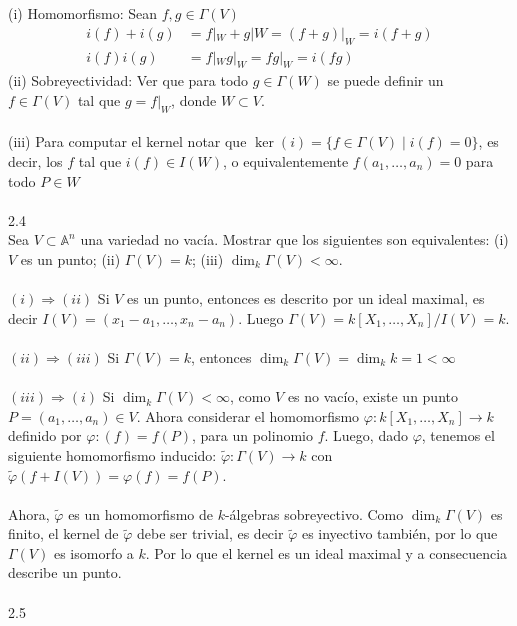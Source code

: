 \documentclass{article}
\newcommand{\A}{\mathbb{A}}
\begin{document}
\\
\\
(i) Homomorfismo: Sean $f,g \in \Gamma(V)$
\begin{equation*}
\begin{aligned}
    i(f)+i(g)&=f|_W + g|W=(f+g)|_W=i(f+g) \\
    i(f)i(g)&=f|_W g|_W=fg|_W=i(fg)
\end{aligned}
\end{equation*}
(ii) Sobreyectividad: Ver que para todo $g \in \Gamma(W)$ se puede definir un $f \in \Gamma(V)$ tal que $g=f|_W$, donde $W \subset V$.
\\
\\
(iii) Para computar el kernel notar que $\operatorname{ker}(i)=\{ f \in \Gamma(V) \mid i(f)=0\}$, es decir, los $f$ tal que $i(f) \in I(W)$, o equivalentemente $f(a_1,\dots,a_n)=0$ para todo $P \in W$
\\
\\
2.4
\\
Sea $V \subset \A^n$ una variedad no vacía. Mostrar que los siguientes son equivalentes: (i) $V$ es un punto; (ii) $\Gamma(V)=k$; (iii) $\operatorname{dim}_{k}\Gamma(V) < \infty$.
\\
\\
$(i) \Longrightarrow (ii)$ Si $V$ es un punto, entonces es descrito por un ideal maximal, es decir $I(V)=(x_1-a_1,\dots,x_n-a_n)$. Luego $\Gamma(V)=k[X_1,\dots,X_n]/I(V)=k$.
\\
\\
$(ii) \Longrightarrow (iii)$ Si $\Gamma(V)=k$, entonces $\operatorname{dim}_{k}\Gamma(V)=\operatorname{dim}_{k}k=1<\infty$
\\
\\
$(iii)\Longrightarrow(i)$ Si $\operatorname{dim}_{k}\Gamma(V) < \infty$, como $V$ es no vacío, existe un punto $P=(a_1,\dots,a_n) \in V$. Ahora considerar el homomorfismo $\varphi: k[X_1,\dots,X_n]\to k$ definido por $\varphi:(f)=f(P)$, para un polinomio $f$. Luego, dado $\varphi$, tenemos el siguiente homomorfismo inducido: $\tilde{\varphi}: \Gamma(V)\to k$ con $\tilde{\varphi}(f+I(V))=\varphi(f)=f(P)$.
\\
\\
Ahora, $\tilde{\varphi}$ es un homomorfismo de $k$-álgebras sobreyectivo. Como $\operatorname{dim}_{k}\Gamma(V)$ es finito, el kernel de $\tilde{\varphi}$ debe ser trivial, es decir $\tilde{\varphi}$ es inyectivo también, por lo que $\Gamma(V)$ es isomorfo a $k$. Por lo que el kernel es un ideal maximal y a consecuencia describe un punto.
\\
\\
2.5
\end{document}
